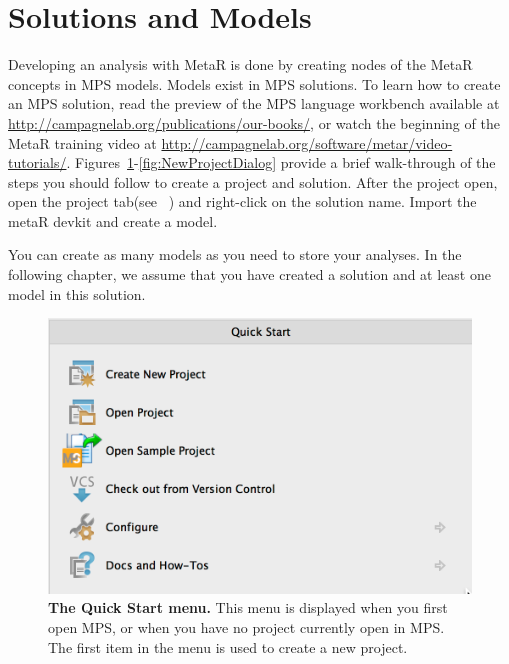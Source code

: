 \section{Solutions and Models}
Developing an analysis with MetaR is done by creating nodes of the MetaR concepts in MPS models. Models exist in MPS solutions. To learn how to create an MPS solution, read the preview of the MPS language workbench available at \url{http://campagnelab.org/publications/our-books/}\cite{campagne2014mps}, or watch the beginning of the MetaR training video at \url{http://campagnelab.org/software/metar/video-tutorials/}. Figures~\ref{fig:QuickStartMenu}-\ref{fig:NewProjectDialog} provide a brief walk-through of the steps you should follow to create a project and solution. After the project open, open the project tab(see ~\cite{campagne2014mps}) and right-click on the solution name. Import the metaR devkit and create a model. 

You can create as many models as you need to store your analyses. In the following chapter, we assume that you have created a solution and at least one model in this solution. 


\begin{figure}
  \includegraphics[width=\figWidthNarrow]{figures/QuickStart.png}
  \caption[The Quick Start menu.]{\textbf{The Quick Start menu.} This menu is displayed when you first open MPS, or when you have no project currently open in MPS. The first item in the menu is used to create a new project. 
}\label{fig:QuickStartMenu}
\end{figure}

